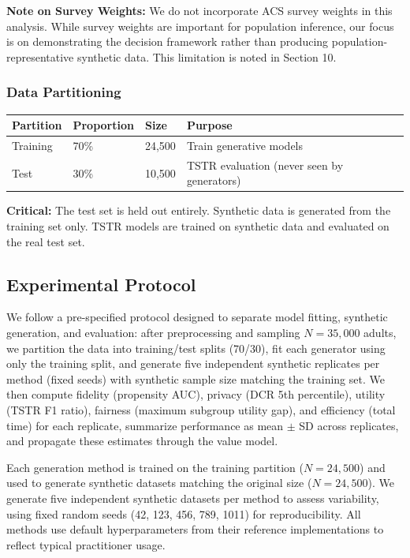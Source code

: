 \documentclass[12pt,a4paper]{article}
\begin{document}
\textbf{Note on Survey Weights:} We do not incorporate ACS survey weights in this analysis. While survey weights are important for population inference, our focus is on demonstrating the decision framework rather than producing population-representative synthetic data. This limitation is noted in Section 10.

\subsubsection{Data Partitioning}

\begin{table}[htbp]
\centering
\begin{tabular}{@{}llll@{}}
\toprule
\textbf{Partition} & \textbf{Proportion} & \textbf{Size} & \textbf{Purpose} \\
\midrule
Training & 70\% & 24,500 & Train generative models \\
Test & 30\% & 10,500 & TSTR evaluation (never seen by generators) \\
\bottomrule
\end{tabular}
\end{table}

\textbf{Critical:} The test set is held out entirely. Synthetic data is generated from the training set only. TSTR models are trained on synthetic data and evaluated on the real test set.

\subsection{Experimental Protocol}

We follow a pre-specified protocol designed to separate model fitting, synthetic generation, and evaluation: after preprocessing and sampling $N=35{,}000$ adults, we partition the data into training/test splits (70/30), fit each generator using only the training split, and generate five independent synthetic replicates per method (fixed seeds) with synthetic sample size matching the training set. We then compute fidelity (propensity AUC), privacy (DCR 5th percentile), utility (TSTR F1 ratio), fairness (maximum subgroup utility gap), and efficiency (total time) for each replicate, summarize performance as mean $\pm$ SD across replicates, and propagate these estimates through the value model.

Each generation method is trained on the training partition ($N = 24{,}500$) and used to generate synthetic datasets matching the original size ($N = 24{,}500$). We generate five independent synthetic datasets per method to assess variability, using fixed random seeds (42, 123, 456, 789, 1011) for reproducibility. All methods use default hyperparameters from their reference implementations to reflect typical practitioner usage.
\end{document}
